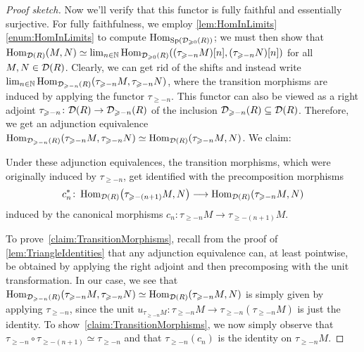 \begin{proof}[Proof sketch]
	Now we'll verify that this functor is fully faithful and essentially surjective. For fully faithfulness, we employ \cref{lem:HomInLimits}\cref{enum:HomInLimits} to compute $\operatorname{Hom}_{\mathrm{Sp}(\mathcal{D}_{\geqslant 0}(R))}$; we must then show that $\operatorname{Hom}_{\mathcal{D}(R)}(M,N)\simeq \operatorname*{lim}_{n\in\mathbb{N}}\operatorname{Hom}_{\mathcal{D}_{\geqslant 0}(R)}((\tau_{\geqslant -n}M)[n],(\tau_{\geqslant -n}N)[n])$ for all $M,N\in\mathcal{D}(R)$. Clearly, we can get rid of the shifts and instead write $\operatorname*{lim}_{n\in\mathbb{N}}\operatorname{Hom}_{\mathcal{D}_{\geqslant -n}(R)}(\tau_{\geqslant -n}M,\tau_{\geqslant -n}N)$, where the transition morphisms are induced by applying the functor $\tau_{\geqslant -n}$. This functor can also be viewed as a right adjoint $\tau_{\geqslant -n}\colon \mathcal{D}(R)\rightarrow \mathcal{D}_{\geqslant -n}(R)$ of the inclusion $\mathcal{D}_{\geqslant -n}(R)\subseteq \mathcal{D}(R)$. Therefore, we get an adjunction equivalence $\operatorname{Hom}_{\mathcal{D}_{\geqslant -n}(R)}(\tau_{\geqslant -n}M,\tau_{\geqslant -n}N)\simeq \operatorname{Hom}_{\mathcal{D}(R)}(\tau_{\geqslant -n}M,N)$. We claim:
	\begin{alphanumerate}\itshape
		\item[\boxtimes] Under these adjunction equivalences, the transition morphisms, which were originally induced by $\tau_{\geqslant -n}$, get identified with the precomposition morphisms\label{claim:TransitionMorphisms}
		\begin{equation*}
			c_n^*\colon \Hom_{\Dd(R)}\left(\tau_{\geqslant -(n+1)}M,N\right)\longrightarrow \Hom_{\Dd(R)}\left(\tau_{\geqslant -n}M,N\right)
		\end{equation*}
		induced by the canonical morphisms $c_n\colon \tau_{\geqslant -n}M\rightarrow \tau_{\geqslant -(n+1)}M$.
	\end{alphanumerate}
	To prove~\cref{claim:TransitionMorphisms}, recall from the proof of \cref{lem:TriangleIdentities} that any adjunction equivalence can, at least pointwise, be obtained by applying the right adjoint and then precomposing with the unit transformation. In our case, we see that $\operatorname{Hom}_{\mathcal{D}_{\geqslant -n}(R)}(\tau_{\geqslant -n}M,\tau_{\geqslant -n}N)\simeq \operatorname{Hom}_{\mathcal{D}(R)}(\tau_{\geqslant -n}M,N)$ is simply given by applying $\tau_{\geqslant -n}$, since the unit $u_{\tau_{\geqslant -n} M}\colon \tau_{\geqslant -n}M\rightarrow \tau_{\geqslant -n}(\tau_{\geqslant -n}M)$ is just the identity. To show~\cref{claim:TransitionMorphisms}, we now simply observe that $\tau_{\geqslant -n}\circ\tau_{\geqslant -(n+1)}\simeq \tau_{\geqslant -n}$ and that $\tau_{\geqslant -n}(c_n)$ is the identity on $\tau_{\geqslant -n}M$.
	

\end{proof}
